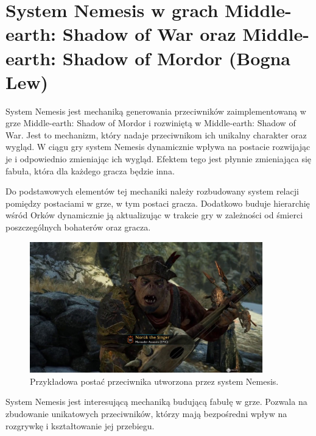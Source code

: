 \section{System Nemesis w grach Middle-earth: Shadow of War oraz Middle-earth: Shadow of Mordor (Bogna Lew)}
System Nemesis jest mechaniką generowania przeciwników zaimplementowaną w grze Middle-earth: Shadow of Mordor i
rozwiniętą w Middle-earth: Shadow of War. Jest to mechanizm, który nadaje przeciwnikom ich unikalny charakter oraz
wygląd. W ciągu gry system Nemesis dynamicznie wpływa na postacie rozwijając je i odpowiednio zmieniając ich wygląd.
Efektem tego jest płynnie zmieniająca się fabuła, która dla każdego gracza będzie inna.

Do podstawowych elementów tej mechaniki należy rozbudowany system relacji pomiędzy postaciami w grze, w tym postaci
gracza. Dodatkowo buduje hierarchię wśród Orków dynamicznie ją aktualizując w trakcie gry w zależności od śmierci
poszczególnych bohaterów oraz gracza.

\begin{figure}[h!]
    \centering
    \includegraphics[width=0.9\textwidth]{images/system_nemesis.png}
    \caption{Przykładowa postać przeciwnika utworzona przez system Nemesis.}
\end{figure}

System Nemesis jest interesującą mechaniką budującą fabułę w grze. Pozwala na zbudowanie unikatowych przeciwników,
którzy mają bezpośredni wpływ na rozgrywkę i kształtowanie jej przebiegu.